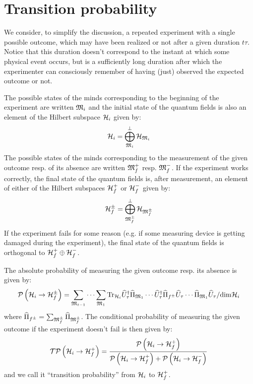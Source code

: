 \documentclass[10pt,a4paper,twoside,openany]{book}
\begin{document}
\section{Transition probability}

We consider, to simplify the discussion, a repeated experiment with a single possible outcome, which may have been realized or not after a given duration $t \tau$. Notice that this duration doesn't correspond to the instant at which some physical event occurs, but is a sufficiently long duration after which the experimenter can consciously remember of having (just) observed the expected outcome or not.

The possible states of the minds corresponding to the beginning of the experiment are written $\mathfrak{M}_i$ and the initial state of the quantum fields is also an element of the Hilbert subspace $\mathcal H_i$ given by:
\begin{equation*}
\mathcal H_i = \bigoplus_{\mathfrak{M}_i}^\perp \mathcal H_{\mathfrak{M}_i}
\end{equation*}
The possible states of the minds corresponding to the measurement of the given outcome resp. of its absence are written $\mathfrak{M}_f^+$ resp. $\mathfrak{M}_f^-$. If the experiment works correctly, the final state of the quantum fields is, after measurement, an element of either of the Hilbert subspaces $\mathcal H_f^+$ or $\mathcal H_f^-$ given by:
\begin{equation*}
\mathcal H_f^\pm = \bigoplus_{\mathfrak{M}_f^\pm}^\perp \mathcal H_{\mathfrak{M}_f^\pm}
\end{equation*}
If the experiment fails for some reason (e.g. if some measuring device is getting damaged during the experiment), the final state of the quantum fields is orthogonal to $\mathcal H_f^+ \oplus \mathcal H_f^-$.

The absolute probability of measuring the given outcome resp. its absence is given by:
\begin{equation*}
\mathcal P \left( {\mathcal H_i} \to {\mathcal H_f^\pm} \right) = \sum_{\mathfrak{M}_{t - 1}} \dotsm \sum_{\mathfrak{M}_1} \mathrm{Tr}_{\mathcal H_i} \widehat{U}^{\dagger}_\tau \widehat{\Pi}_{\mathfrak{M}_1} \dotsm \widehat{U}^{\dagger}_\tau \widehat{\Pi}_{f^\pm} \widehat{U}_\tau \dotsm \widehat{\Pi}_{\mathfrak{M}_1} \widehat{U}_\tau / \mathrm{dim} \mathcal H_i
\end{equation*}
where $\widehat{\Pi}_{f^\pm} = \sum_{\mathfrak{M}_f^\pm} \widehat{\Pi}_{\mathfrak{M}_f^\pm}$. The conditional probability of measuring the given outcome if the experiment doesn't fail is then given by:
\begin{equation*}
\mathcal T \mathcal P \left( {\mathcal H_i} \to {\mathcal H_f^+} \right) = \frac{\mathcal P \left( {\mathcal H_i} \to {\mathcal H_f^+} \right)}{\mathcal P \left( {\mathcal H_i} \to {\mathcal H_f^+} \right) + \mathcal P \left( {\mathcal H_i} \to {\mathcal H_f^-} \right)}
\end{equation*}
and we call it ``transition probability'' from $\mathcal H_i$ to $\mathcal H_f^+$.
\end{document}
